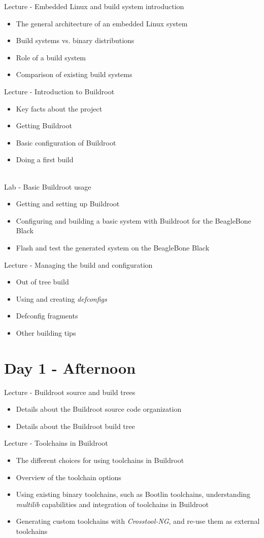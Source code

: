 \documentclass[a4paper,12pt,obeyspaces,spaces,hyphens]{article}
\begin{document}
\feagendatwocolumn
{Lecture - Embedded Linux and build system introduction}
{
  \begin{itemize}
  \item The general architecture of an embedded Linux system
  \item Build systems vs. binary distributions
  \item Role of a build system
  \item Comparison of existing build systems
  \end{itemize}
}
{Lecture - Introduction to Buildroot}
{
  \begin{itemize}
  \item Key facts about the project
  \item Getting Buildroot
  \item Basic configuration of Buildroot
  \item Doing a first build
  \end{itemize}
}
\\
\feagendatwocolumn
{Lab - Basic Buildroot usage}
{
  \begin{itemize}
  \item Getting and setting up Buildroot
  \item Configuring and building a basic system with Buildroot for the
    BeagleBone Black
  \item Flash and test the generated system on the BeagleBone Black
  \end{itemize}
}
{Lecture - Managing the build and configuration}
{
  \begin{itemize}
  \item Out of tree build
  \item Using and creating {\em defconfigs}
  \item Defconfig fragments
  \item Other building tips
  \end{itemize}
}

\section{Day 1 - Afternoon}


\feagendatwocolumn
{Lecture - Buildroot source and build trees}
{
  \begin{itemize}
  \item Details about the Buildroot source code organization
  \item Details about the Buildroot build tree
  \end{itemize}
}
{Lecture - Toolchains in Buildroot}
{
  \begin{itemize}
  \item The different choices for using toolchains in Buildroot
  \item Overview of the toolchain options
  \item Using existing binary toolchains, such as Bootlin
    toolchains, understanding {\em multilib} capabilities and
    integration of toolchains in Buildroot
  \item Generating custom toolchains with {\em Crosstool-NG}, and
    re-use them as external toolchains
  \end{itemize}
}
\end{document}
